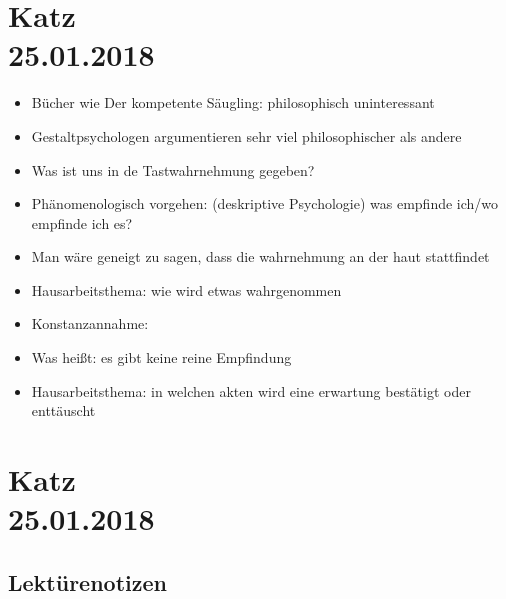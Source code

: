 \documentclass[emulatestandardclasses]{scrartcl}
\begin{document}
\section{Katz\\25.01.2018}

\begin{itemize}
  \item Bücher wie Der kompetente Säugling: philosophisch uninteressant
  \item Gestaltpsychologen argumentieren sehr viel philosophischer als andere
  \item Was ist uns in de Tastwahrnehmung gegeben?
  \item Phänomenologisch vorgehen: (deskriptive Psychologie) was empfinde ich/wo empfinde ich es?
  \item Man wäre geneigt zu sagen, dass die wahrnehmung an der haut stattfindet
  \item Hausarbeitsthema: wie wird etwas wahrgenommen
  \item Konstanzannahme: 
  \item Was heißt: es gibt keine reine Empfindung
  \item Hausarbeitsthema: in welchen akten wird eine erwartung bestätigt oder enttäuscht
\end{itemize}

\section{Katz\\25.01.2018}

\subsection{Lektürenotizen}
\end{document}
